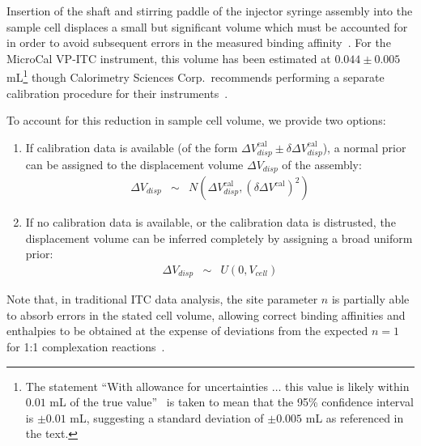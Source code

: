 \documentclass[aps,pre,twocolumn,nofootinbib,superscriptaddress,linenumbers]{revtex4-1}
\begin{document}
Insertion of the shaft and stirring paddle of the injector syringe assembly into the sample cell displaces a small but significant volume which must be accounted for in order to avoid subsequent errors in the measured binding affinity~\cite{tellinghuisen:anal-biochem:2004:volume-errors-in-itc}.
For the MicroCal VP-ITC instrument, this volume has been estimated at $0.044 \pm 0.005$ mL\footnote{The statement ``With allowance for uncertainties $\ldots$ this value is likely within $0.01$ mL of the true value''~\cite{tellinghuisen:anal-biochem:2004:volume-errors-in-itc} is taken to mean that the 95\% confidence interval is $\pm 0.01$ mL, suggesting a standard deviation of $\pm 0.005$ mL as referenced in the text.} though Calorimetry Sciences Corp.~recommends performing a separate calibration procedure for their instruments~\cite{tellinghuisen:anal-biochem:2004:volume-errors-in-itc}.

To account for this reduction in sample cell volume, we provide two options:
\begin{enumerate}
\item If calibration data is available (of the form $\Delta V_{disp}^\mathrm{cal} \pm \delta \Delta V_{disp}^\mathrm{cal}$), a normal prior can be assigned to the displacement volume $\Delta V_{disp}$ of the assembly:
\begin{eqnarray}
\Delta V_{disp} &\sim& N(\Delta V_{disp}^\mathrm{cal}, (\delta \Delta V^\mathrm{cal})^2)
\end{eqnarray}

\item If no calibration data is available, or the calibration data is distrusted, the displacement volume can be inferred completely by assigning a broad uniform prior:
\begin{eqnarray}
\Delta V_{disp} &\sim& U(0, V_{cell})
\end{eqnarray}
\end{enumerate}
Note that, in traditional ITC data analysis, the site parameter $n$ is partially able to absorb errors in the stated cell volume, allowing correct binding affinities and enthalpies to be obtained at the expense of deviations from the expected $n = 1$ for 1:1 complexation reactions~\cite{tellinghuisen:anal-biochem:2004:volume-errors-in-itc}.

\end{document}
